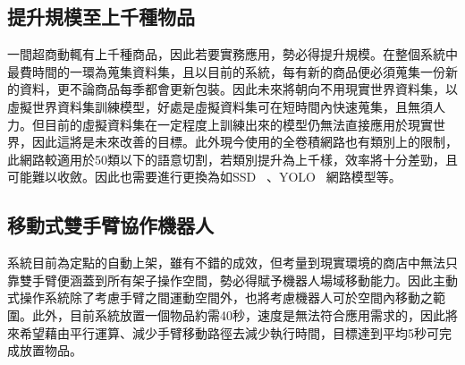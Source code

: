 \subsection{提升規模至上千種物品}
一間超商動輒有上千種商品，因此若要實務應用，勢必得提升規模。在整個系統中最費時間的一環為蒐集資料集，且以目前的系統，每有新的商品便必須蒐集一份新的資料，更不論商品每季都會更新包裝。因此未來將朝向不用現實世界資料集，以虛擬世界資料集訓練模型，好處是虛擬資料集可在短時間內快速蒐集，且無須人力。但目前的虛擬資料集在一定程度上訓練出來的模型仍無法直接應用於現實世界，因此這將是未來改善的目標。此外現今使用的全卷積網路也有類別上的限制，此網路較適用於50類以下的語意切割，若類別提升為上千樣，效率將十分差勁，且可能難以收斂。因此也需要進行更換為如SSD ~\cite{liu2016ssd}、YOLO ~\cite{redmon2016you}網路模型等。

\subsection{移動式雙手臂協作機器人}
系統目前為定點的自動上架，雖有不錯的成效，但考量到現實環境的商店中無法只靠雙手臂便涵蓋到所有架子操作空間，勢必得賦予機器人場域移動能力。因此主動式操作系統除了考慮手臂之間運動空間外，也將考慮機器人可於空間內移動之範圍。此外，目前系統放置一個物品約需40秒，速度是無法符合應用需求的，因此將來希望藉由平行運算、減少手臂移動路徑去減少執行時間，目標達到平均5秒可完成放置物品。

